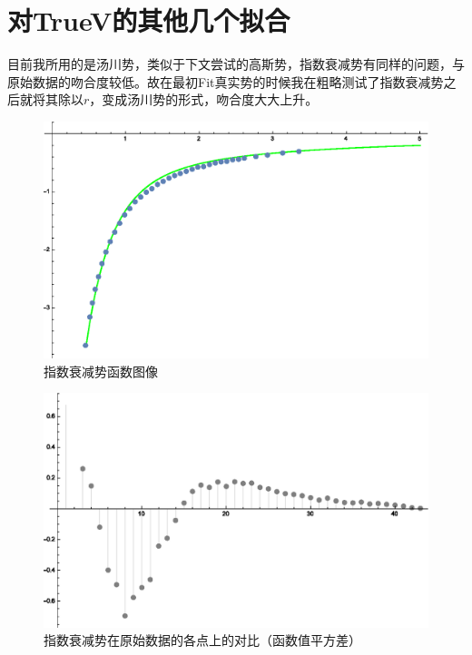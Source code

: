 \documentclass[hyperref]{ctexart}
\begin{document}
\section{对TrueV的其他几个拟合}
目前我所用的是汤川势，类似于下文尝试的高斯势，指数衰减势有同样的问题，与原始数据的吻合度较低。故在最初Fit真实势的时候我在粗略测试了指数衰减势之后就将其除以$r$，变成汤川势的形式，吻合度大大上升。
\clearpage
\begin{figure}[!htbp]
  \centering
  \includegraphics[width=5.2in]{Test_ReconstructLepage.eps}
  \caption{指数衰减势函数图像}
\end{figure}
\begin{figure}[!htbp]
  \centering
  \includegraphics[width=5.2in]{Test_ReconstructLepage1.eps}
  \caption{指数衰减势在原始数据的各点上的对比（函数值平方差）}
\end{figure}
\end{document}
